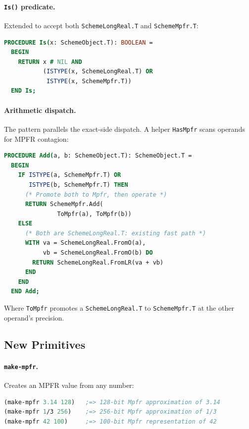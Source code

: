 \documentclass[12pt]{article}
\begin{document}
\paragraph{{\tt Is()} predicate.}
Extended to accept both {\tt SchemeLongReal.T} and {\tt SchemeMpfr.T}:

\begin{lstlisting}[language=Modula3]
PROCEDURE Is(x: SchemeObject.T): BOOLEAN =
  BEGIN
    RETURN x # NIL AND
           (ISTYPE(x, SchemeLongReal.T) OR
            ISTYPE(x, SchemeMpfr.T))
  END Is;
\end{lstlisting}

\paragraph{Arithmetic dispatch.}
The pattern parallels the exact-side dispatch.  A helper
{\tt HasMpfr} scans operands for MPFR contagion:

\begin{lstlisting}[language=Modula3]
PROCEDURE Add(a, b: SchemeObject.T): SchemeObject.T =
  BEGIN
    IF ISTYPE(a, SchemeMpfr.T) OR
       ISTYPE(b, SchemeMpfr.T) THEN
      (* Promote both to Mpfr, then operate *)
      RETURN SchemeMpfr.Add(
               ToMpfr(a), ToMpfr(b))
    ELSE
      (* Both are SchemeLongReal.T: existing fast path *)
      WITH va = SchemeLongReal.FromO(a),
           vb = SchemeLongReal.FromO(b) DO
        RETURN SchemeLongReal.FromLR(va + vb)
      END
    END
  END Add;
\end{lstlisting}

\noindent Where {\tt ToMpfr} promotes a {\tt SchemeLongReal.T}
to {\tt SchemeMpfr.T} at the other operand's precision.

\subsection{New Primitives}

\paragraph{{\tt make-mpfr}.}
Creates an MPFR value from any number:

\begin{lstlisting}[language=Scheme]
(make-mpfr 3.14 128)   ;=> 128-bit Mpfr approximation of 3.14
(make-mpfr 1/3 256)    ;=> 256-bit Mpfr approximation of 1/3
(make-mpfr 42 100)     ;=> 100-bit Mpfr representation of 42
\end{lstlisting}
\end{document}
